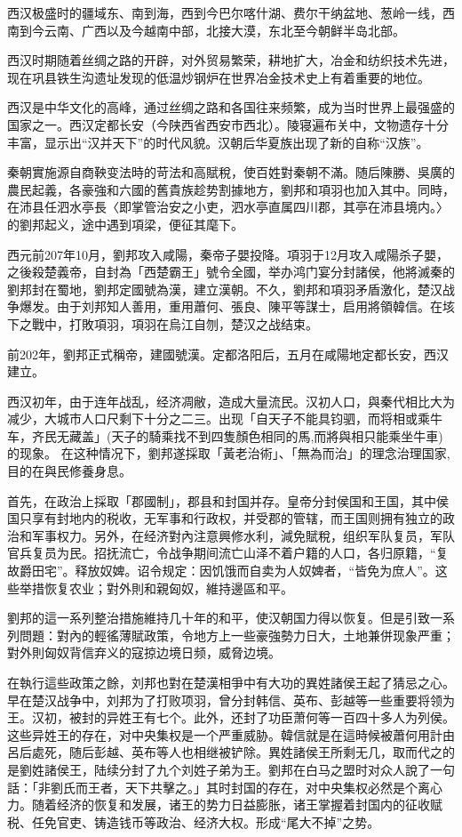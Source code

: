 西汉极盛时的疆域东、南到海，西到今巴尔喀什湖、费尔干纳盆地、葱岭一线，西南到今云南、广西以及今越南中部，北接大漠，东北至今朝鲜半岛北部。

西汉时期随着丝绸之路的开辟，对外贸易繁荣，耕地扩大，冶金和纺织技术先进，现在巩县铁生沟遗址发现的低温炒钢炉在世界冶金技术史上有着重要的地位。

西汉是中华文化的高峰，通过丝绸之路和各国往来频繁，成为当时世界上最强盛的国家之一。西汉定都长安（今陕西省西安市西北）。陵寝遍布关中，文物遗存十分丰富，显示出“汉并天下”的时代风貌。汉朝后华夏族出现了新的自称“汉族”。

秦朝實施源自商鞅变法時的苛法和高賦稅，使百姓對秦朝不滿。随后陳勝、吳廣的農民起義，各豪強和六國的舊貴族趁势割據地方，劉邦和項羽也加入其中。同時，在沛县任泗水亭長〈即掌管治安之小吏，泗水亭直属四川郡，其亭在沛县境内。〉的劉邦起义，途中遇到項梁，便征其麾下。

西元前207年10月，劉邦攻入咸陽，秦帝子嬰投降。項羽于12月攻入咸陽杀子嬰，之後殺楚義帝，自封為「西楚霸王」號令全國，举办鸿门宴分封諸侯，他將滅秦的劉邦封在蜀地，劉邦定國號為漢，建立漢朝。不久，劉邦和項羽矛盾激化，楚汉战争爆发。由于刘邦知人善用，重用蕭何、張良、陳平等謀士，启用將領韓信。在垓下之戰中，打敗項羽，項羽在烏江自刎，楚汉之战结束。

前202年，劉邦正式稱帝，建國號漢。定都洛阳后，五月在咸陽地定都长安，西汉建立。

西汉初年，由于连年战乱，经济凋敝，造成大量流民。汉初人口，與秦代相比大为减少，大城市人口尺剩下十分之二三。出现「自天子不能具钧驷，而将相或乘牛车，齐民无藏盖」(天子的騎乘找不到四隻顏色相同的馬,而將與相只能乘坐牛車)的现象。 在这种情况下，劉邦遂採取「黃老治術」、「無為而治」的理念治理国家,目的在與民修養身息。

首先，在政治上採取「郡國制」，郡县和封国并存。皇帝分封侯国和王国，其中侯国只享有封地内的税收，无军事和行政权，并受郡的管辖，而王国则拥有独立的政治和军事权力。另外，在经济對內注意興修水利，減免賦稅，组织军队复员，军队官兵复员为民。招抚流亡，令战争期间流亡山泽不着户籍的人口，各归原籍，“复故爵田宅”。释放奴婢。诏令规定：因饥饿而自卖为人奴婢者，“皆免为庶人”。这些举措恢复农业；對外則和親匈奴，維持邊區和平。

劉邦的這一系列整治措施維持几十年的和平，使汉朝国力得以恢复。但是引致一系列問題：對內的輕徭薄賦政策，令地方上一些豪強勢力日大，土地兼併现象严重；對外則匈奴背信弃义的寇掠边境日频，威脅边境。

在執行這些政策之餘，刘邦也對在楚漢相爭中有大功的異姓諸侯王起了猜忌之心。早在楚汉战争中，刘邦为了打败项羽，曾分封韩信、英布、彭越等一些重要将领为王。汉初，被封的异姓王有七个。此外，还封了功臣萧何等一百四十多人为列侯。这些异姓王的存在，对中央集权是一个严重威胁。韓信就是在這時候被蕭何用計由呂后處死，随后彭越、英布等人也相继被铲除。異姓諸侯王所剩无几，取而代之的是劉姓諸侯王，陆续分封了九个刘姓子弟为王。劉邦在白马之盟时对众人說了一句話：「非劉氏而王者，天下共擊之。」其时封国的存在，对中央集权必然是个离心力。随着经济的恢复和发展，诸王的势力日益膨胀，诸王掌握着封国内的征收赋税、任免官吏、铸造钱币等政治、经济大权。形成“尾大不掉”之势。

